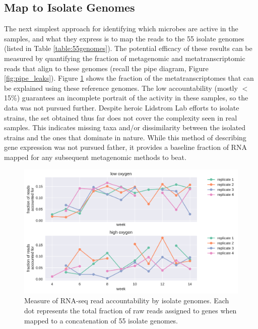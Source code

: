 \subsection{Map to Isolate Genomes}

The next simplest approach for identifying which microbes are active in the samples, and what they express is to map the reads to the 55 isolate genomes (listed in Table \ref{table:55genomes}).
The potential efficacy of these results can be measured by quantifying the fraction of metagenomic and metatranscriptomic reads that align to these genomes (recall the pipe diagram, Figure \ref{fig:pipe_leaks}).
Figure \ref{fig:isolate_RNAseq} shows the fraction of the metatranscriptomes that can be explained using these reference genomes.
The low accountability (mostly $<$15\%) guarantees an incomplete portrait of the activity in these samples, so the data was not pursued further.
Despite heroic Lidstrom Lab efforts to isolate strains, the set obtained thus far does not cover the complexity seen in real samples.
This indicates missing taxa and/or dissimilarity between the isolated strains and the ones that dominate in nature.
While this method of describing gene expression was not pursued father, it provides a baseline fraction of RNA mapped for any subsequent metagenomic methods to beat.


\begin{figure}[H]
\centering
    \includegraphics[width=1.0\textwidth]{./tex/chapter2/figures/170208_fraction_of_transcriptome_reads_mapped_to_isolates.pdf}
    \begin{singlespace}
    \caption[Measure of RNA-seq read accountability by isolate genomes]{
        Measure of RNA-seq read accountability by isolate genomes.
        Each dot represents the total fraction of raw reads assigned to genes when mapped to a concatenation of 55 isolate genomes.
        }
    \label{fig:isolate_RNAseq}
    \end{singlespace}
\end{figure}


